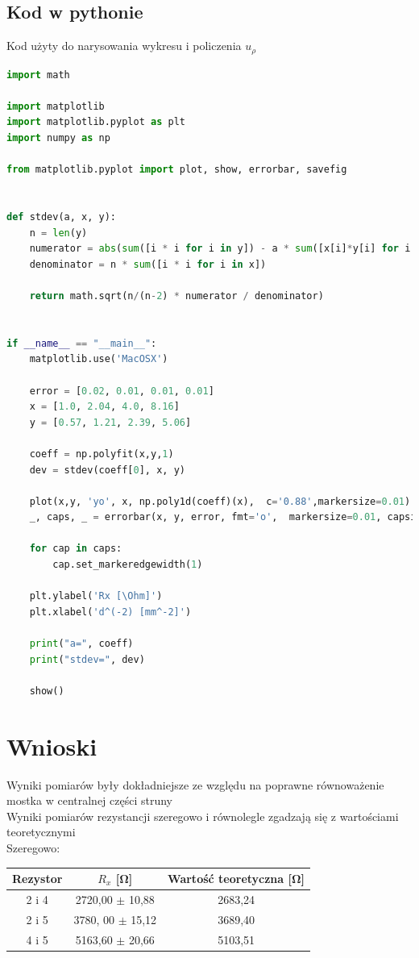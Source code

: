 \documentclass{article}
\begin{document}
\subsection{Kod w pythonie}
Kod użyty do narysowania wykresu i policzenia $u_\rho$
\begin{lstlisting}[language=Python]
import math

import matplotlib
import matplotlib.pyplot as plt
import numpy as np

from matplotlib.pyplot import plot, show, errorbar, savefig


def stdev(a, x, y): 
    n = len(y)
    numerator = abs(sum([i * i for i in y]) - a * sum([x[i]*y[i] for i in range(n)]))
    denominator = n * sum([i * i for i in x])

    return math.sqrt(n/(n-2) * numerator / denominator)


if __name__ == "__main__":
    matplotlib.use('MacOSX')

    error = [0.02, 0.01, 0.01, 0.01]
    x = [1.0, 2.04, 4.0, 8.16]
    y = [0.57, 1.21, 2.39, 5.06]

    coeff = np.polyfit(x,y,1)
    dev = stdev(coeff[0], x, y)

    plot(x,y, 'yo', x, np.poly1d(coeff)(x),  c='0.88',markersize=0.01)
    _, caps, _ = errorbar(x, y, error, fmt='o',  markersize=0.01, capsize=1)

    for cap in caps:
        cap.set_markeredgewidth(1)

    plt.ylabel('Rx [\Ohm]')
    plt.xlabel('d^(-2) [mm^-2]')

    print("a=", coeff)
    print("stdev=", dev)

    show()

\end{lstlisting}


\section{Wnioski}

Wyniki pomiarów były dokładniejsze ze względu na poprawne równoważenie mostka w centralnej części struny \\

Wyniki pomiarów rezystancji szeregowo i równolegle zgadzają się z wartościami teoretycznymi\\

Szeregowo:

\begin{center}
    \begin{tabular}{ c | c | c }
    Rezystor & $R_x$ [\si{\ohm}] & Wartość teoretyczna [\si{\ohm}]\\
    \hline
     2 i 4  & 2720,00 $\pm$ 10,88& 2683,24\\ 
     2 i 5  & 3780, 00 $\pm$ 15,12 & 3689,40\\ 
     4 i 5  & 5163,60 $\pm$ 20,66&  5103,51\\ 
    \end{tabular}
\end{center}
\end{document}
